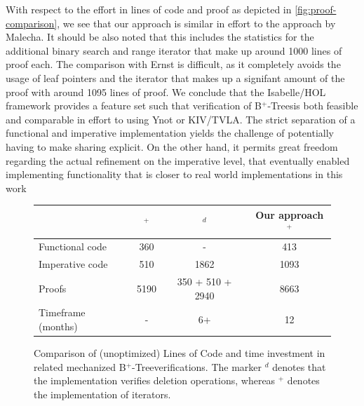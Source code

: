 \documentclass[a4paper,UKenglish,cleveref, autoref, thm-restate]{lipics-v2021}
\newcommand{\btree}{B$^+$-Tree}
\newcommand{\btrees}{B$^+$-Trees}
\begin{document}
With respect to the effort in lines of code and proof
as depicted in \autoref{fig:proof-comparison}, we see
that our approach is similar in effort to the approach by Malecha.
It should be also noted that this includes the statistics
for the additional binary search and range iterator
that make up around 1000 lines of proof each.
The comparison with Ernst is difficult, as it completely
avoids the usage of leaf pointers and the iterator
that makes up a signifant amount of the proof
with around 1095 lines of proof.
We conclude that the Isabelle/HOL framework
provides a feature set
such that verification of \btrees is both feasible
and comparable in effort to using Ynot or KIV/TVLA.
The strict separation of a functional and imperative
implementation yields the challenge
of potentially having to make sharing explicit.
On the other hand, it permits great freedom
regarding the actual refinement on the imperative level,
that eventually enabled
implementing functionality that is closer
to real world implementations in this work

\begin{figure}
    \centering
    \begin{tabular}{l|c|c|c}
        \                & \cite{DBLP:conf/popl/MalechaMSW10}$^{+}$ & \cite{DBLP:journals/sosym/ErnstSR15}$^{d}$ & Our approach$^{+}$ \\
        \hline
        Functional code &   360      & -                    & 413  \\ %
        Imperative code &   510      & 1862                  & 1093  \\
        Proofs          &  5190      & 350 + 510 + 2940\footnotemark[7] & 8663 \\
        Timeframe (months) &  -     & 6+                      & 12   \\
    \end{tabular}
    \caption[Comparison of (unoptimized) Lines of Code and time investment in related mechanized \btree verifications.]
    {Comparison of (unoptimized) Lines of Code and time investment in related mechanized \btree verifications.
    The marker $^d$ denotes that the implementation verifies deletion operations, whereas $^+$ denotes the implementation of iterators.
    }
    \label{fig:proof-comparison}
\end{figure}
\end{document}
